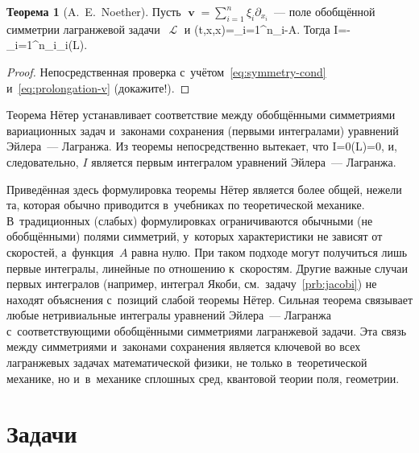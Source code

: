 \documentclass[a4paper,11pt]{article}
\def\[#1\]{\begin{align*}#1\end{align*}}
\newcommand\eqtag[1]{\refstepcounter{equation}\tag{\theequation}\label{#1}}
\theoremstyle{definition}
\newtheorem*{theorem*}{Теорема}
\begin{document}
\begin{theorem*}[A.~E.~Noether]
Пусть $\mbfv=\sum_{i=1}^n\xi_i\partial_{x_i}$~— поле обобщённой симметрии
лагранжевой задачи~$\mscrL$ и
	\[
	I(t,x,\dot x)=\sum_{i=1}^n\xi_i-A.
	\]
Тогда
	\[
	\dot I=-\sum_{i=1}^n\xi_i\mbfsansE_i(L).
	\eqtag{eq:dotI}
	\]
\end{theorem*}

\begin{proof}
Непосредственная проверка с~учётом~\eqref{eq:symmetry-cond}
и~\eqref{eq:prolongation-v} (докажите!).
\end{proof}

Теорема Нётер устанавливает соответствие между обобщёнными симметриями
вариационных задач и~законами сохранения (первыми интегралами) уравнений
Эйлера~— Лагранжа. Из теоремы непосредственно вытекает, что
	\[
	\dot I=0\bmod\mbfsansE(L)=0,
	\]
и, следовательно, $I$ является первым интегралом уравнений Эйлера~— Лагранжа.

Приведённая здесь формулировка теоремы Нётер является более общей, нежели та,
которая обычно приводится в~учебниках по теоретической механике. В~традиционных
(слабых) формулировках ограничиваются обычными (не обобщёнными) полями
симметрий, у~которых характеристики не зависят от скоростей, а~функция~$A$
равна нулю. При таком подходе могут получиться лишь первые интегралы, линейные
по отношению к~скоростям. Другие важные случаи первых интегралов (например,
интеграл Якоби, см.~задачу~\ref{prb:jacobi}) не находят объяснения с~позиций
слабой теоремы Нётер. Сильная теорема связывает любые нетривиальные
интегралы уравнений Эйлера~— Лагранжа с~соответствующими обобщёнными
симметриями лагранжевой задачи. Эта связь между симметриями и~законами
сохранения является ключевой во всех лагранжевых задачах математической физики,
не только в~теоретической механике, но и~в~механике сплошных сред, квантовой
теории поля, геометрии.

\section{Задачи}
\end{document}
